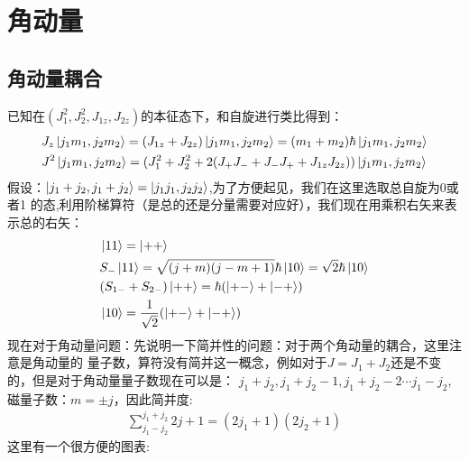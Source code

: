 \documentclass[UTF8]{article}
\numberwithin{equation}{section}
\begin{document}
\section{角动量}
\subsection{角动量耦合}
已知在$(J_1^2,J_2^2,J_{1z},J_{2z})$的本征态下，和自旋进行类比得到：
\begin{align*}
     & J_z \ket{j_1m_1,j_2m_2}=(J_{1z}+J_{2z})\ket{j_1m_1,j_2m_2}=(m_1+m_2)\hbar\ket{j_1m_1,j_2m_2} \\
     & J^2 \ket{j_1m_1,j_2m_2} = (J_1^2+J_2^2+2(J_+J_-+J_-J_++J_{1z}J_{2z}))\ket{j_1m_1,j_2m_2}
\end{align*}
假设：$\ket{j_1+j_2,j_1+j_2}=\ket{j_1j_1,j_2j_2}$,为了方便起见，我们在这里选取总自旋为0或者1
的态,利用阶梯算符（是总的还是分量需要对应好），我们现在用乘积右矢来表示总的右矢：
\begin{align*}
     & \ket{11}=\ket{++}                                                     \\
     & S_-\ket{11}=\sqrt{(j+m)(j-m+1)}\hbar \ket{10}=\sqrt{2}\hbar\ket{{10}} \\
     & (S_{1-}+S_{2-})\ket{++}=\hbar(\ket{+-}+\ket{-+})                      \\
     & \ket{10}=\frac{1}{\sqrt{2}}(\ket{+-}+\ket{-+})
\end{align*}
现在对于角动量问题：先说明一下简并性的问题：对于两个角动量的耦合，这里注意是角动量的
量子数，算符没有简并这一概念，例如对于$J=J_1+J_2$还是不变的，但是对于角动量量子数现在可以是：
$j_1+j_2,j_1+j_2-1,j_1+j_2-2\cdots j_1-j_2$,磁量子数：$m=\pm j$，因此简并度:
\begin{align*}
    \sum_{j_1-j_2}^{j_1+j_2} 2j+1 =(2j_1+1)(2j_2+1)
\end{align*}
这里有一个很方便的图表:
\end{document}
